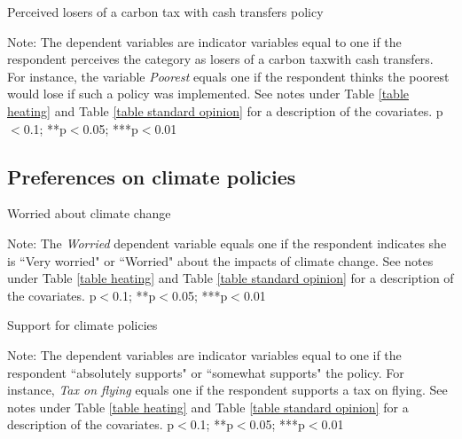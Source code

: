 \documentclass{article}
\begin{document}
\begin{table}[h!]
	\caption{Perceived losers of a carbon tax with cash transfers policy}
	\begin{center}
		\scalebox{0.7}{}
	\end{center}
	{\footnotesize Note: The dependent variables are indicator variables equal to one if the respondent perceives the category as losers of a carbon taxwith cash transfers. For instance, the variable \textit{Poorest} equals one if the respondent thinks the poorest would lose if such a policy was implemented. See notes under Table \ref{table heating} and Table \ref{table standard opinion} for a description of the covariates.
	\newline *p$<$0.1; **p$<$0.05; ***p$<$0.01}
\end{table}	

\clearpage
\subsection{Preferences on climate policies}

\begin{table}[h!]
	\caption{Worried about climate change}
	\begin{center}
		\scalebox{0.7}{}
	\end{center}
	{\footnotesize Note: The \textit{Worried} dependent variable equals one if the respondent indicates she is ``Very worried" or ``Worried" about the impacts of climate change. See notes under Table \ref{table heating} and Table \ref{table standard opinion} for a description of the covariates.
	\newline *p$<$0.1; **p$<$0.05; ***p$<$0.01}
\end{table}	

\begin{table}[h!]
	\caption{Support for climate policies}
	\begin{center}
		\scalebox{0.7}{}
	\end{center}
	{\footnotesize Note: The dependent variables are indicator variables equal to one if the respondent ``absolutely supports" or ``somewhat supports" the policy. For instance, \textit{Tax on flying} equals one if the respondent supports a tax on flying. See notes under Table \ref{table heating} and Table \ref{table standard opinion} for a description of the covariates.
	\newline *p$<$0.1; **p$<$0.05; ***p$<$0.01}
\end{table}	
\end{document}
